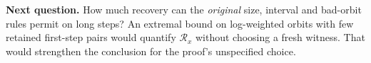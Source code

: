 \documentclass[12pt,letterpaper]{article}
\newcommand{\para}[1]{\par\medskip\noindent\textbf{#1}\quad}
\begin{document}
\para{Next question.} How much recovery can the \emph{original} size, interval and bad-orbit rules permit on long steps? An extremal bound on log-weighted orbits with few retained first-step pairs would quantify \(\mathcal R_x\) without choosing a fresh witness. That would strengthen the conclusion for the proof's unspecified choice.
\end{document}
